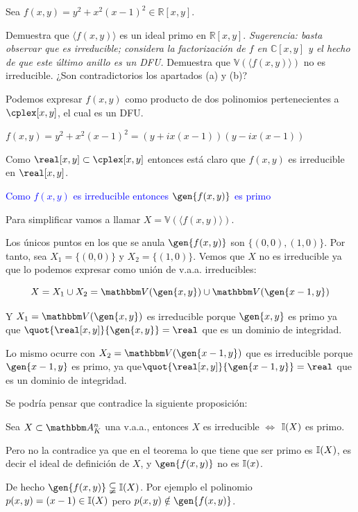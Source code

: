 \begin{problem}
	 Sea  $f(x,y)=y^2+x^2(x-1)^2\in \mathbb{R}[x,y]$.

	 \ppart Demuestra que  $\langle f(x,y)\rangle$ es un ideal primo en  ${\mathbb
	 		R}[x,y]$. {\em Sugerencia: basta observar que  es irreducible; considera la factorización de $f$ en ${\mathbb C}[x,y]$ y el hecho de que
	 		este último anillo es un DFU.}
	 \ppart Demuestra que ${\mathbb V}(\langle f(x,y)\rangle)$  no es irreducible.
	 \ppart ¿Son contradictorios los apartados  (a) y (b)?

	 \solution

	 \spart
	 Podemos expresar $f(x,y)$ como producto de dos polinomios pertenecientes a $\cplex[x,y]$, el cual es un DFU.

	 $f(x,y)=y^2+x^2(x-1)^2=(y+ix(x-1))(y-ix(x-1))$

	 Como $\real[x,y] \subset \cplex[x,y]$ entonces está claro que $f(x,y)$ es irreducible en $\real[x,y]$.

	 \textcolor{blue}{Como $f(x,y)$ es irreducible entonces $\gen{f(x,y)}$ es primo}
	 
	 \spart
	 Para simplificar vamos a llamar $X={\mathbb V}(\langle f(x,y)\rangle)$.

	 Los únicos puntos en los que se anula $\gen{f(x,y)}$ son $\{(0,0),(1,0)\}$. Por tanto, sea $X_1=\{(0,0)\}$ y $X_2=\{(1,0)\}$. Vemos que $X$ no es irreducible ya que lo podemos expresar como unión de v.a.a. irreducibles:

	 $$X=X_1 \cup X_2=\V(\gen{x,y}) \cup \V(\gen{x-1,y})$$

	 Y $X_1=\V(\gen{x,y})$ es irreducible porque $\gen{x,y}$ es primo ya que $\quot{\real[x,y]}{\gen{x,y}}=\real$ que es un dominio de integridad.

	 Lo mismo ocurre con $X_2=\V(\gen{x-1,y})$ que es irreducible porque  $\gen{x-1,y}$ es primo, ya que$\quot{\real[x,y]}{\gen{x-1,y}}=\real$ que es un dominio de integridad.

	 \spart

	 Se podría pensar que contradice la siguiente proposición:
	 \begin{prop}
	 	Sea $X \subset \A_K^n$ una v.a.a., entonces $X$ es irreducible $\Leftrightarrow$ $\mathbb{I}(X)$ es primo.
	 \end{prop}

	 Pero no la contradice ya que en el teorema lo que tiene que ser primo es $\mathbb{I}(X)$, es decir el ideal de definición de $X$, y $\gen{f(x,y)}$ no es $\mathbb{I}(x)$.

	 De hecho $\gen{f(x,y)} \subsetneqq \I(X)$. Por ejemplo el polinomio $p(x,y)=(x-1) \in \mathbb{I}(X)$ pero $p(x,y) \notin \gen{f(x,y)}$.
\end{problem}

